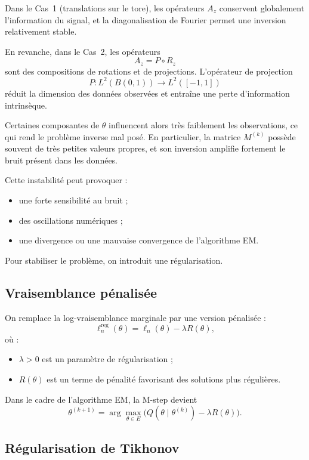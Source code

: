 \documentclass[12pt, a4paper]{article}
\theoremstyle{definition}
\begin{document}
Dans le Cas~1 (translations sur le tore), les opérateurs $A_z$ conservent globalement l'information du signal, et la diagonalisation de Fourier permet une inversion relativement stable.

En revanche, dans le Cas~2, les opérateurs
\[
A_z = P \circ R_z
\]
sont des compositions de rotations et de projections. L'opérateur de projection
\[
P : L^2(B(0,1)) \to L^2([-1,1])
\]
réduit la dimension des données observées et entraîne une perte d'information intrinsèque.

Certaines composantes de $\theta$ influencent alors très faiblement les observations, ce qui rend le problème inverse mal posé. En particulier, la matrice $M^{(k)}$ possède souvent de très petites valeurs propres, et son inversion amplifie fortement le bruit présent dans les données.

Cette instabilité peut provoquer :
\begin{itemize}
\item une forte sensibilité au bruit ;
\item des oscillations numériques ;
\item une divergence ou une mauvaise convergence de l'algorithme EM.
\end{itemize}

Pour stabiliser le problème, on introduit une régularisation.

\subsection{Vraisemblance pénalisée}

On remplace la log-vraisemblance marginale par une version pénalisée :
\[
\ell_n^{\mathrm{reg}}(\theta) = \ell_n(\theta) - \lambda R(\theta),
\]
où :
\begin{itemize}
\item $\lambda > 0$ est un paramètre de régularisation ;
\item $R(\theta)$ est un terme de pénalité favorisant des solutions plus régulières.
\end{itemize}

Dans le cadre de l'algorithme EM, la M-step devient
\[
\theta^{(k+1)} = \arg\max_{\theta\in E} \bigl( Q(\theta\mid\theta^{(k)}) - \lambda R(\theta) \bigr).
\]

\subsection{Régularisation de Tikhonov}
\end{document}
